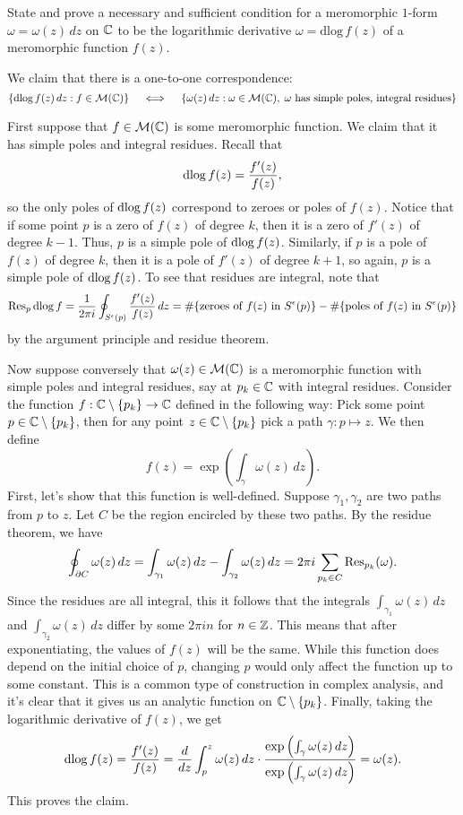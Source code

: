\documentclass{pset}
\begin{document}
\begin{problem}{3.27}
  State and prove a necessary and sufficient condition for a meromorphic $1$-form $\omega = \omega(z) \,dz$ on $\mathbb{C}$ to be the logarithmic derivative $\omega =\textrm{dlog}\,f(z)$ of a meromorphic function $f(z)$.
\end{problem}

\begin{solution}
  We claim that there is a one-to-one correspondence:
  \[
    \{ \textrm{dlog}\,f(z)\,dz : f\in \mathcal{M}(\mathbb{C})\}  \quad\iff\quad \{ \omega(z)\,dz : \omega\in \mathcal{M}(\mathbb{C}), \;\omega\textrm{ has simple poles, integral residues}\}
  \]

  First suppose that $f\in \mathcal{M}(\mathbb{C})$ is some meromorphic function. We claim that it has simple poles and integral residues. Recall that 
  \[
    \mathrm{dlog}\,f(z) = \frac{f'(z)}{f(z)},
  \]
  so the only poles of $\mathrm{dlog}\, f(z)$ correspond to zeroes or poles of $f(z)$. Notice that if some point $p$ is a zero of $f(z)$ of degree $k$, then it is a zero of $f'(z)$ of degree $k-1$. Thus, $p$ is a simple pole of $\mathrm{dlog}\, f(z)$. Similarly, if $p$ is a pole of $f(z)$ of degree $k$, then it is a pole of $f'(z)$ of degree $k+1$, so again, $p$ is a simple pole of $\mathrm{dlog}\, f(z)$. To see that residues are integral, note that
  \[
    \textrm{Res}_{p}\, \mathrm{dlog}\,f = \frac{1}{2\pi i}\oint_{S^\epsilon(p)} \frac{f'(z)}{f(z)}\,dz = \#\{\textrm{zeroes of }f(z)\textrm{ in }S^\epsilon(p)\} -\#\{\textrm{poles of }f(z)\textrm{ in }S^\epsilon(p)\}
  \]
  by the argument principle and residue theorem.

  Now suppose conversely that $\omega(z)\in \mathcal{M}(\mathbb{C})$ is a meromorphic function with simple poles and integral residues, say at $p_k\in \mathbb{C}$ with integral residues. Consider the function $f : \mathbb{C} \setminus \{p_k\} \to \mathbb{C}$ defined in the following way: Pick some point $p\in \mathbb{C}\setminus \{p_k\}$, then for any point $z\in \mathbb{C}\setminus\{p_k\}$ pick a path $\gamma : p \mapsto z$. We then define
  \[
    f(z) = \exp\left(\int_\gamma \omega(z)\,dz\right).
  \]
  First, let's show that this function is well-defined. Suppose $\gamma_1, \gamma_2$ are two paths from $p$ to $z$. Let $C$ be the region encircled by these two paths. By the residue theorem, we have
  \[
    \oint_{\partial C} \omega(z)\,dz = \int_{\gamma_1} \omega(z) \,dz - \int_{\gamma_2} \omega(z)\,dz = 2\pi i \sum_{p_k\in C} \textrm{Res}_{p_k}(\omega).
  \]
  Since the residues are all integral, this it follows that the integrals $\int_{\gamma_1} \omega(z)\,dz$ and $\int_{\gamma_2} \omega(z)\,dz$ differ by some $2\pi i n$ for $n\in \mathbb{Z}$. This means that after exponentiating, the values of $f(z)$ will be the same. While this function does depend on the initial choice of $p$, changing $p$ would only affect the function up to some constant. This is a common type of construction in complex analysis, and it's clear that it gives us an analytic function on $\mathbb{C}\setminus \{p_k\}$. Finally, taking the logarithmic derivative of $f(z)$, we get
  \[
    \mathrm{dlog}\,f(z) = \frac{f'(z)}{f(z)} = \frac{d}{dz}\int_p^z \omega(z)\,dz\cdot \frac{\exp \left(\int_\gamma \omega(z)\,dz\right)}{\exp \left(\int_\gamma \omega(z)\,dz\right)} = \omega(z).
  \]
  This proves the claim.
\end{solution}
\end{document}
